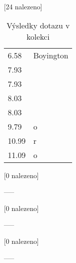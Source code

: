 \begin{table}[H]
\begin{tt}

\horizlina

\noindent
\begin{minipage}[t]{.5\textwidth}\vspace{0pt}
 [24 nalezeno]\vspace{5pt}

\begin{tabulary}{1.1\textwidth}{LL}
6.58  &  Boyington \\
7.93  &   \\
7.93  &   \\
8.03  &   \\
8.03  &   \\
9.79  & o  \\
10.99 &  r  \\
11.09 &  o  \\
\end{tabulary}
\end{minipage}
\begin{minipage}[t]{.5\textwidth}\vspace{0pt}
 [0 nalezeno]\vspace{5pt}

-----
\end{minipage}

\horizlina

\noindent
\begin{minipage}[t]{.5\textwidth}\vspace{0pt}
 [0 nalezeno]\vspace{5pt}

-----
\end{minipage}
\begin{minipage}[t]{.5\textwidth}\vspace{0pt}
 [0 nalezeno]\vspace{5pt}

-----
\end{minipage}

\horizlina
\end{tt}

\caption{Výsledky dotazu  v kolekci }
\label{tab:result:paul_mccountry}
\end{table}
